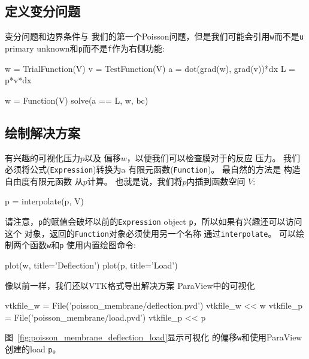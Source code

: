 \subsection{定义变分问题}

变分问题和边界条件与
我们的第一个Poisson问题，但是我们可能会引用\texttt{w}而不是\texttt{u}
primary unknown和\texttt{p}而不是\texttt{f}作为右侧功能:

\begin{python}
w = TrialFunction(V)
v = TestFunction(V)
a = dot(grad(w), grad(v))*dx
L = p*v*dx

w = Function(V)
solve(a == L, w, bc)
\end{python}

\subsection{绘制解决方案}

有兴趣的可视化压力$p$以及
偏移$w$，以便我们可以检查膜对于的反应
压力。 我们必须将公式(\texttt{Expression})转换为a
有限元函数(\texttt{Function})。 最自然的方法是
构造自由度有限元函数
从$p$计算。 也就是说，我们将$p$内插到函数空间
$V$:

\begin{python}
p = interpolate(p, V)
\end{python}
请注意，\texttt{p}的赋值会破坏以前的\texttt{Expression}
object \texttt{p}，所以如果有兴趣还可以访问这个
对象，返回的\texttt{Function}对象必须使用另一个名称
通过\texttt{interpolate}。 可以绘制两个函数\texttt{w}和\texttt{p}
使用内置绘图命令:

\begin{python}
plot(w, title='Deflection')
plot(p, title='Load')
\end{python}
像以前一样，我们还以VTK格式导出解决方案
ParaView中的可视化

\begin{python}
vtkfile_w = File('poisson_membrane/deflection.pvd')
vtkfile_w << w
vtkfile_p = File('poisson_membrane/load.pvd')
vtkfile_p << p
\end{python}
图~\ref{fig:poisson_membrane_deflection_load}显示可视化
的偏移\texttt{w}和使用ParaView创建的load \texttt{p}。


